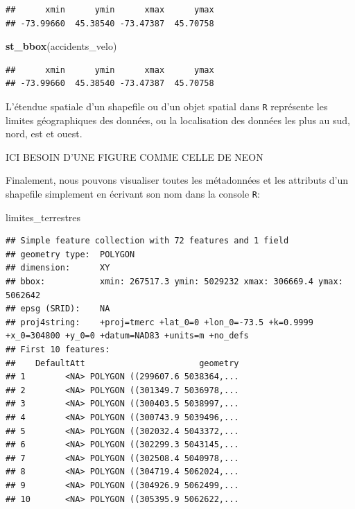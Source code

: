 \documentclass[]{article}
\newenvironment{Shaded}{\begin{snugshade}}{\end{snugshade}}
\newcommand{\KeywordTok}[1]{\textcolor[rgb]{0.13,0.29,0.53}{\textbf{#1}}}
\newcommand{\NormalTok}[1]{#1}
\begin{document}
\begin{verbatim}
##      xmin      ymin      xmax      ymax 
## -73.99660  45.38540 -73.47387  45.70758
\end{verbatim}

\begin{Shaded}
\begin{Highlighting}[]
\KeywordTok{st_bbox}\NormalTok{(accidents_velo)}
\end{Highlighting}
\end{Shaded}

\begin{verbatim}
##      xmin      ymin      xmax      ymax 
## -73.99660  45.38540 -73.47387  45.70758
\end{verbatim}

L'étendue spatiale d'un shapefile ou d'un objet spatial dans \texttt{R}
représente les limites géographiques des données, ou la localisation des
données les plus au sud, nord, est et ouest.

ICI BESOIN D'UNE FIGURE COMME CELLE DE NEON

Finalement, nous pouvons visualiser toutes les métadonnées et les
attributs d'un shapefile simplement en écrivant son nom dans la console
\texttt{R}:

\begin{Shaded}
\begin{Highlighting}[]
\NormalTok{limites_terrestres}
\end{Highlighting}
\end{Shaded}

\begin{verbatim}
## Simple feature collection with 72 features and 1 field
## geometry type:  POLYGON
## dimension:      XY
## bbox:           xmin: 267517.3 ymin: 5029232 xmax: 306669.4 ymax: 5062642
## epsg (SRID):    NA
## proj4string:    +proj=tmerc +lat_0=0 +lon_0=-73.5 +k=0.9999 +x_0=304800 +y_0=0 +datum=NAD83 +units=m +no_defs
## First 10 features:
##    DefaultAtt                       geometry
## 1        <NA> POLYGON ((299607.6 5038364,...
## 2        <NA> POLYGON ((301349.7 5036978,...
## 3        <NA> POLYGON ((300403.5 5038997,...
## 4        <NA> POLYGON ((300743.9 5039496,...
## 5        <NA> POLYGON ((302032.4 5043372,...
## 6        <NA> POLYGON ((302299.3 5043145,...
## 7        <NA> POLYGON ((302508.4 5040978,...
## 8        <NA> POLYGON ((304719.4 5062024,...
## 9        <NA> POLYGON ((304926.9 5062499,...
## 10       <NA> POLYGON ((305395.9 5062622,...
\end{verbatim}
\end{document}
